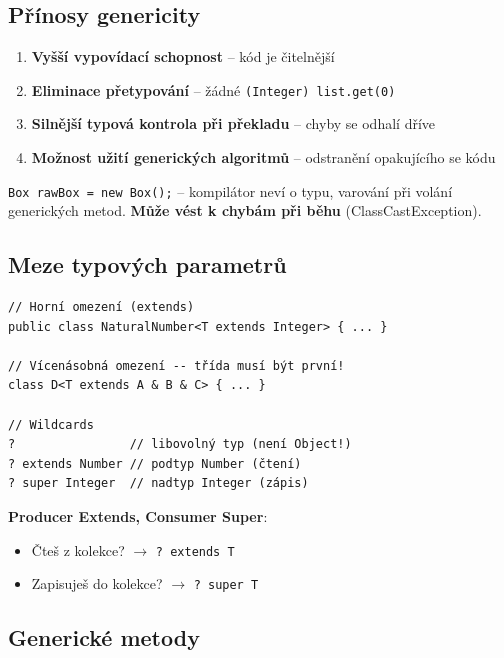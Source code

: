 \documentclass[11pt,a4paper]{article}
\begin{document}
\subsection{Přínosy genericity}

\begin{enumerate}
    \item \textbf{Vyšší vypovídací schopnost} -- kód je čitelnější
    \item \textbf{Eliminace přetypování} -- žádné \texttt{(Integer) list.get(0)}
    \item \textbf{Silnější typová kontrola při překladu} -- chyby se odhalí dříve
    \item \textbf{Možnost užití generických algoritmů} -- odstranění opakujícího se kódu
\end{enumerate}

\begin{tcolorbox}[warnbox,title=Nebezpečí raw typů]
\texttt{Box rawBox = new Box();} -- kompilátor neví o typu, varování při volání generických metod. \textbf{Může vést k chybám při běhu} (ClassCastException).
\end{tcolorbox}

\subsection{Meze typových parametrů}

\begin{verbatim}
// Horní omezení (extends)
public class NaturalNumber<T extends Integer> { ... }

// Vícenásobná omezení -- třída musí být první!
class D<T extends A & B & C> { ... }

// Wildcards
?                // libovolný typ (není Object!)
? extends Number // podtyp Number (čtení)
? super Integer  // nadtyp Integer (zápis)
\end{verbatim}

\begin{tcolorbox}[tipbox,title=PECS pravidlo]
\textbf{Producer Extends, Consumer Super}:
\begin{itemize}
    \item Čteš z kolekce? $\rightarrow$ \texttt{? extends T}
    \item Zapisuješ do kolekce? $\rightarrow$ \texttt{? super T}
\end{itemize}
\end{tcolorbox}

\subsection{Generické metody}
\end{document}
